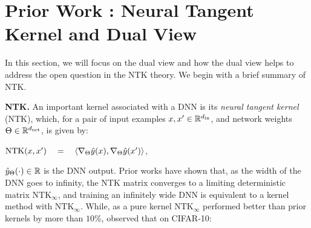 \section{Prior Work : Neural Tangent Kernel and Dual View}\label{sec:prelim}
In this section, we will focus on the dual view \citep{npk} and how the dual view helps to address the open question in the NTK theory. We begin with a brief summary of NTK.

\textbf{NTK.}  An important kernel associated with a DNN is its \emph{neural tangent kernel} (NTK), which, for a pair of input examples $x,x'\in\mathbb{R}^{d_{\text{in}}}$, and network weights $\Theta\in\mathbb{R}^{d_{\text{net}}}$, is given by:

{\centering  $\text{NTK}(x,x')\quad = \quad \langle \nabla_{\Theta}\hat{y}(x), \nabla_{\Theta}\hat{y}(x')\rangle$,\quad{}\par}
$\hat{y}_\Theta(\cdot)\in\mathbb{R}$ is the DNN output. Prior works \citep{ntk,arora2019exact,cao2019generalization} have shown that, as the width of the DNN goes to infinity, the NTK matrix converges to a limiting deterministic matrix $\text{NTK}_{\infty}$, and training an infinitely wide DNN is equivalent to a kernel method with $\text{NTK}_{\infty}$.  While, as a pure kernel $\text{NTK}_{\infty}$ performed better than prior kernels by more than $10\%$, \cite{arora2019exact} observed that on CIFAR-10:

